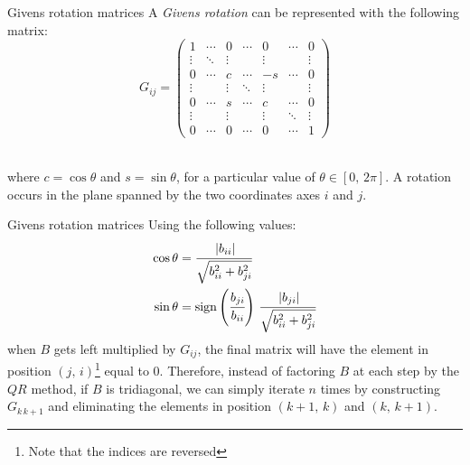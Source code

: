 \documentclass[10pt]{beamer}
\DeclareMathOperator{\sign}{sign}
\begin{document}
\begin{frame}{Givens rotation matrices}
    A \textit{Givens rotation} can be represented with the following matrix:
    $$
    G_{ij} =
    \begin{pmatrix}
        1 & \cdots & 0 & \cdots & 0 & \cdots & 0 \\
        \vdots & \ddots & \vdots & & \vdots & & \vdots \\
        0 & \cdots & c & \cdots & -s & \cdots & 0 \\
        \vdots & & \vdots & \ddots & \vdots & & \vdots \\
        0 & \cdots & s & \cdots & c & \cdots & 0 \\
        \vdots & & \vdots & & \vdots & \ddots & \vdots \\
        0 & \cdots & 0 & \cdots & 0 & \cdots & 1
    \end{pmatrix}
    $$ \\ \bigskip \bigskip

    where $c = \cos \theta$ and  $s = \sin \theta$, for a particular value of $ \theta \in [0, \, 2 \pi] $. \newline
    A rotation occurs in the plane spanned by the two coordinates axes $i$ and $j$.

\end{frame}

\begin{frame}{Givens rotation matrices}
    Using the following values:
    $$
    \begin{aligned}
        \cos \theta &=  \cfrac{\left\lvert b_{ii} \right\rvert}{ \sqrt{ b_{ii}^2 +   b_{ji}^2} } \\
        \sin \theta &= \sign \left( \cfrac{ b_{ji} }{ b_{ii} } \right)   \, \cfrac{\left\lvert b_{ji} \right\rvert}{ \sqrt{ b_{ii}^2 +   b_{ji}^2} } \\
    \end{aligned}
    $$
    when $B$ gets left multiplied by $G_{ij}$, the final matrix will have the element in position $(j, \, i)$\footnote{Note that the indices are reversed} equal to $0$. \newline
    Therefore, instead of factoring $B$ at each step by the $QR$ method, if $B$ is tridiagonal, we can simply iterate $n$ times by constructing $G_{k\,k+1}$ and eliminating the elements in position $(k+1, \, k)$ and $(k, \, k+1)$.
\end{frame}
\end{document}
